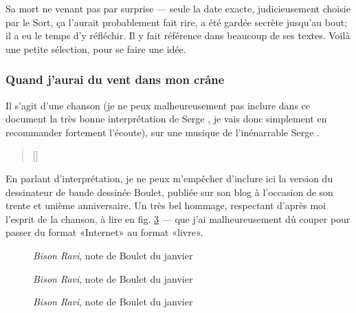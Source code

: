 Sa mort ne venant pas par surprise --- seule la date exacte,
judicieusement choisie par le Sort, ça l'aurait probablement fait rire,
a été gardée secrète jusqu'au bout; il a eu le temps d'y réfléchir. Il y
fait référence dans beaucoup de ses textes. Voilà une petite sélection,
pour se faire une idée.

\subsubsection{Quand j'aurai du vent dans mon crâne}

Il s'agit d'une chanson
(je ne peux malheureusement pas inclure dans ce document
la très bonne interprétation de Serge , je vais donc simplement
en recommander fortement l'écoute), sur une musique de l'inénarrable Serge .

\begin{multicols}{2}
{\footnotesize
\settowidth{\versewidth}{Quand j'aurai du vent dans mon crâne}
\begin{verse}[\versewidth]

\end{verse}
}
\end{multicols}

En parlant d'interprétation, je ne peux m'empêcher d'inclure ici la version
du dessinateur de bande dessinée Boulet, publiée sur son blog à l'occasion
de son trente et unième anniversaire. Un très bel hommage, respectant
d'après moi l'esprit de la chanson, à lire en fig. \ref{boulet}%
--- que j'ai malheureusement dû couper pour passer du format «Internet» au format «livre».

\begin{figure}[!htb]
\centering
{}
\caption{\emph{Bison Ravi}, note de Boulet du  janvier }
\label{boulet}
\end{figure}
\begin{figure}[!htb]
\ContinuedFloat
\centering
{}
\caption{\emph{Bison Ravi}, note de Boulet du  janvier }
\label{boulet}
\end{figure}
\eject
\begin{figure}[!htb]
\ContinuedFloat
\centering
{}
\caption{\emph{Bison Ravi}, note de Boulet du  janvier }
\label{boulet}
\end{figure}
\eject
\FloatBarrier

